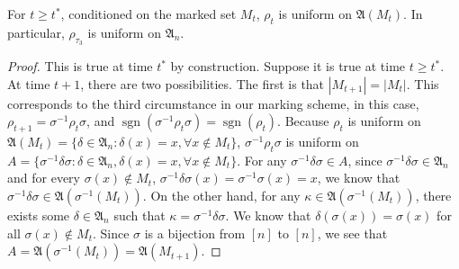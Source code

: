 \begin{lemma}
For $t \geq t^*$, conditioned on the marked set $M_t$, $\rho_t$ is uniform on $\mathfrak{A}(M_t)$. In particular, $\rho_{\tau_3}$ is uniform on $\mathfrak{A}_n$.
\end{lemma}
\begin{proof}
    This is true at time $t^*$ by construction. Suppose it is true at time $t\geq t^*$. At time $t+1$, there are two possibilities. The first is that $|M_{t+1}| = |M_t|$. This corresponds to the third circumstance in our marking scheme, in this case, $\rho_{t+1}=\sigma^{-1}\rho_t\sigma$, and 
        $\operatorname{sgn}(\sigma^{-1}\rho_t\sigma) =\operatorname{sgn}(\rho_t)$. Because $\rho_t$ is uniform on $\mathfrak{A}(M_t) = \{\delta \in \mathfrak{A}_n: \delta(x) = x, \forall x \notin M_t\}$, $\sigma^{-1}\rho_t \sigma$ is uniform on $A = \{\sigma^{-1}\delta\sigma: \delta \in \mathfrak{A}_n, \delta(x) = x, \forall x \notin M_t\}$. For any $\sigma^{-1}\delta\sigma \in A$, since $\sigma^{-1} \delta \sigma \in \mathfrak{A}_n$ and for every $\sigma(x) \notin M_t$, $\sigma^{-1}\delta \sigma (x) = \sigma^{-1}\sigma(x) = x$, we know that $\sigma^{-1}\delta\sigma \in \mathfrak{A}(\sigma^{-1}(M_t))$. On the other hand, for any $\kappa \in \mathfrak{A}(\sigma^{-1}(M_t))$, there exists some $\delta \in \mathfrak{A}_n$ such that $\kappa = \sigma^{-1}\delta\sigma$. We know that $\delta(\sigma(x)) = \sigma(x)$ for all $\sigma(x) \not \in M_t$. Since $\sigma$ is a bijection from $[n]$ to $[n]$, we see that $A = \mathfrak{A}(\sigma^{-1}(M_{t})) = \mathfrak{A}(M_{t+1})$.
        

\end{proof}
